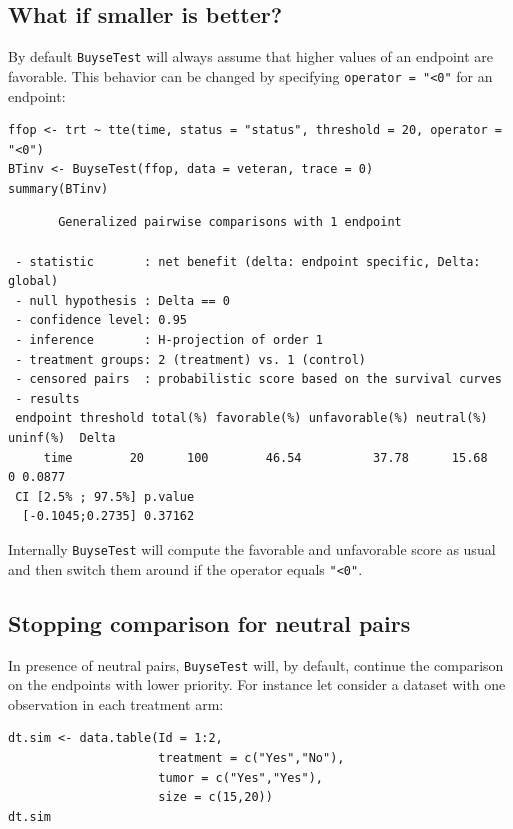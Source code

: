 \documentclass[12pt]{article}
\begin{document}
\clearpage

\subsection{What if smaller is better?}
\label{sec:orgd5dd9b4}
By default \texttt{BuyseTest} will always assume that higher values of an
endpoint are favorable. This behavior can be changed by specifying \texttt{operator = "<0"}
for an endpoint:
\lstset{language=r,label= ,caption= ,captionpos=b,numbers=none}
\begin{lstlisting}
ffop <- trt ~ tte(time, status = "status", threshold = 20, operator = "<0")
BTinv <- BuyseTest(ffop, data = veteran, trace = 0)
summary(BTinv)
\end{lstlisting}

\begin{verbatim}
       Generalized pairwise comparisons with 1 endpoint

 - statistic       : net benefit (delta: endpoint specific, Delta: global) 
 - null hypothesis : Delta == 0 
 - confidence level: 0.95 
 - inference       : H-projection of order 1
 - treatment groups: 2 (treatment) vs. 1 (control) 
 - censored pairs  : probabilistic score based on the survival curves
 - results
 endpoint threshold total(%) favorable(%) unfavorable(%) neutral(%) uninf(%)  Delta
     time        20      100        46.54          37.78      15.68        0 0.0877
 CI [2.5% ; 97.5%] p.value 
  [-0.1045;0.2735] 0.37162
\end{verbatim}

Internally \texttt{BuyseTest} will compute the favorable and unfavorable
score as usual and then switch them around if the operator equals
\texttt{"<0"}.

\clearpage

\subsection{Stopping comparison for neutral pairs}
\label{sec:org42742bb}
In presence of neutral pairs, \texttt{BuyseTest} will, by default, continue
the comparison on the endpoints with lower priority. For instance let
consider a dataset with one observation in each treatment arm:
\lstset{language=r,label= ,caption= ,captionpos=b,numbers=none}
\begin{lstlisting}
dt.sim <- data.table(Id = 1:2,
                     treatment = c("Yes","No"),
                     tumor = c("Yes","Yes"),
                     size = c(15,20))
dt.sim
\end{lstlisting}
\end{document}
